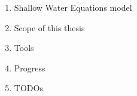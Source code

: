 




\begin{frame}
    
    \begin{enumerate}
    \item Shallow Water Equations model \vspace{0.5cm}
    \item Scope of this thesis\vspace{0.5cm}
    \item Tools\vspace{0.5cm}
    \item Progress\vspace{0.5cm}
    \item TODOs
    \end{enumerate}




\end{frame}
\clearpage


